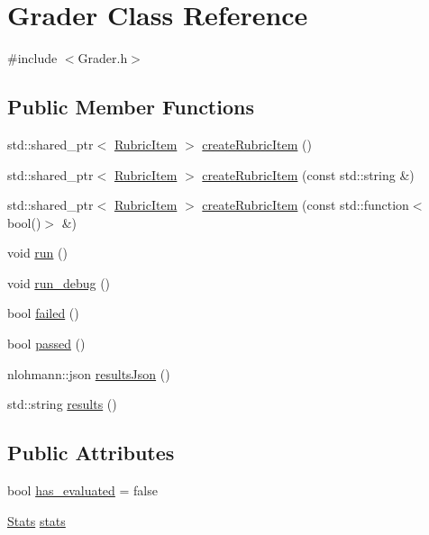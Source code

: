 \hypertarget{class_grader}{}\section{Grader Class Reference}
\label{class_grader}


{\ttfamily \#include $<$Grader.\+h$>$}

\subsection*{Public Member Functions}
\begin{DoxyCompactItemize}
\item 
std\+::shared\+\_\+ptr$<$ \hyperlink{class_rubric_item}{Rubric\+Item} $>$ \hyperlink{class_grader_a1fe6c647f25dcbe5559cd04832521358}{create\+Rubric\+Item} ()
\item 
std\+::shared\+\_\+ptr$<$ \hyperlink{class_rubric_item}{Rubric\+Item} $>$ \hyperlink{class_grader_a7867718932be3b027457c839d29b52b9}{create\+Rubric\+Item} (const std\+::string \&)
\item 
std\+::shared\+\_\+ptr$<$ \hyperlink{class_rubric_item}{Rubric\+Item} $>$ \hyperlink{class_grader_af367b7f22b6df92f3fd9575fad107d50}{create\+Rubric\+Item} (const std\+::function$<$ bool()$>$ \&)
\item 
void \hyperlink{class_grader_a1c0d301659e72b58cc5214663f580c85}{run} ()
\item 
void \hyperlink{class_grader_ac4cb9fc1094fea57d40c277f434d418d}{run\+\_\+debug} ()
\item 
bool \hyperlink{class_grader_acac97fc41ff9582c6bcb167f7537ee08}{failed} ()
\item 
bool \hyperlink{class_grader_a478a74aee440cdd28c9d8c67bcf3fde1}{passed} ()
\item 
nlohmann\+::json \hyperlink{class_grader_a0eb875277cac4c26fa67e5164caa3b38}{results\+Json} ()
\item 
std\+::string \hyperlink{class_grader_a11aecee1c8a72a7251906df8532259b1}{results} ()
\end{DoxyCompactItemize}
\subsection*{Public Attributes}
\begin{DoxyCompactItemize}
\item 
bool \hyperlink{class_grader_a88ad71fe69b966fa4faf4c77d4b09842}{has\+\_\+evaluated} = false
\item 
\hyperlink{class_stats}{Stats} \hyperlink{class_grader_aaa7a08227037ccd8b20d02d372fe567f}{stats}
\end{DoxyCompactItemize}


